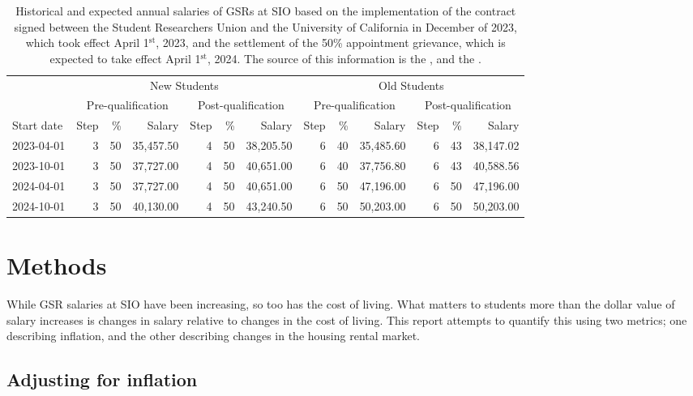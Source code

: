 \documentclass{article}
\begin{document}
\begin{table}[h]
	\centering
	\caption{Historical and expected annual salaries of GSRs at SIO based on the implementation of the contract signed between the Student Researchers Union and the University of California in December of 2023, which took effect April 1$^\text{st}$, 2023, and the settlement of the 50\% appointment grievance, which is expected to take effect April 1$^\text{st}$, 2024. The source of this information is the \cite{gsr_contract}, and the \cite{salary_implementation_email}.}
	\label{tab:contract}
	\begin{tabular}{l r r r r r r r r r r r r}
		\hline		
		& \multicolumn{6}{c}{New Students} & \multicolumn{6}{c}{Old Students} \\
		& \multicolumn{3}{c}{Pre-qualification} & \multicolumn{3}{c}{Post-qualification} & \multicolumn{3}{c}{Pre-qualification} & \multicolumn{3}{c}{Post-qualification} \\
		\hline
		Start date & Step & \% & Salary & Step & \% & Salary & Step & \% & Salary & Step & \% & Salary \\
		\hline
		2023-04-01 & 3 & 50 & 35,457.50 & 4 & 50 & 38,205.50 & 6 & 40 & 35,485.60 & 6 & 43 & 38,147.02 \\
		2023-10-01 & 3 & 50 & 37,727.00 & 4 & 50 & 40,651.00 & 6 & 40 & 37,756.80 & 6 & 43 & 40,588.56 \\
		2024-04-01 & 3 & 50 & 37,727.00 & 4 & 50 & 40,651.00 & 6 & 50 & 47,196.00 & 6 & 50 & 47,196.00 \\
		2024-10-01 & 3 & 50 & 40,130.00 & 4 & 50 & 43,240.50 & 6 & 50 & 50,203.00 & 6 & 50 & 50,203.00 \\
		\hline
	\end{tabular}
\end{table}

\newpage

\section{Methods}

\label{sec:methods}

While GSR salaries at SIO have been increasing, so too has the cost of living. What matters to students more than the dollar value of salary increases is changes in salary relative to changes in the cost of living. This report attempts to quantify this using two metrics; one describing inflation, and the other describing changes in the housing rental market.

\subsection{Adjusting for inflation}
\end{document}
